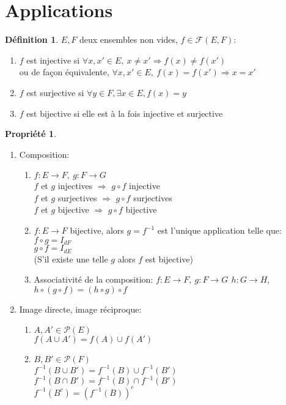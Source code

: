 \documentclass[fleqn]{article}
\theoremstyle{definition} \newtheorem*{defi}{D\'efinition}
\theoremstyle{definition} \newtheorem*{theo}{Th\'eor\`eme}
\theoremstyle{definition} \newtheorem*{coro}{Corollaire}
\theoremstyle{remark} \newtheorem*{rqs}{Remarques}
\theoremstyle{definition} \newtheorem*{prop}{Propri\'et\'e}
\begin{document}
\section{Applications}
\begin{defi}
	\(E, F\) deux ensembles non vides, \( f \in \mathcal{F}(E, F)\):
	\begin{enumerate}
		\item \(f\) est injective si \(\forall x,x' \in E,\ x \neq x' \Rightarrow f(x) \neq f(x')\) \\
		ou de fa\c{c}on \'equivalente, \(\forall x,x' \in E,\ f(x) = f(x') \Rightarrow x = x'\)
		\item \(f\) est surjective si \(\forall y \in F, \exists x \in E, f(x) = y\)
		\item \(f\) est bijective si elle est \`a la fois injective et surjective
	\end{enumerate}
\end{defi}
\begin{prop} $ $
	\begin{enumerate}
		\item Composition:
			\begin{enumerate}
				\item \(f: E \rightarrow F,\ g: F \rightarrow G\) \\
					\(f\) et \(g\) injectives \(\Rightarrow\) \(g \circ f\) injective \\
					\(f\) et \(g\) surjectives \(\Rightarrow\) \(g \circ f\) surjectives \\
					\(f\) et \(g\) bijective \(\Rightarrow\) \(g \circ f\) bijective
				\item \(f: E \rightarrow F\) bijective, alors \(g = f^{-1}\) est l'unique application telle que: \\
					\(f \circ g = I_{dF}\) \\
					\(g \circ f = I_{dE}\) \\
					(S'il existe une telle $g$ alors $f$ est bijective)
				\item Associativit\'e de la composition: \(f: E \rightarrow F,\ g: F \rightarrow G\,\ h: G \rightarrow H\), \\
					\(h \circ (g \circ f) = (h \circ g) \circ f\)
			\end{enumerate}
		\item Image directe, image r\'eciproque:
			\begin{enumerate}
				\item \(A, A' \in \mathcal{P}(E)\) \\
					\(f(A \cup A') = f(A) \cup f(A')\)
				\item \(B, B' \in \mathcal{P}(F)\) \\
					\(f^{-1}(B \cup B') = f^{-1}(B) \cup f^{-1}(B')\) \\
					\(f^{-1}(B \cap B') = f^{-1}(B) \cap f^{-1}(B')\) \\
					\(f^{-1}(B^c) = (f^{-1}(B))^c\)
			\end{enumerate}
	\end{enumerate}
\end{prop}
\end{document}
